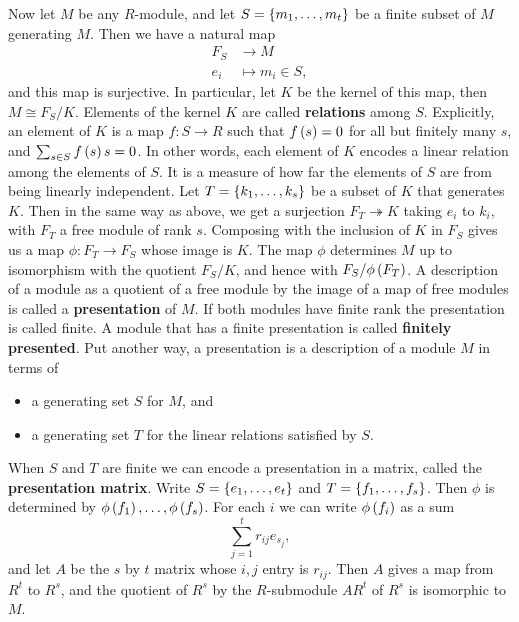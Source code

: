 Now let $ M $ be any $ R $-module, and let $ S = \left\{ m_1, \dots, m_t \right\} $ be a finite subset of $ M $ generating $ M $. Then we have a natural map
\begin{align*}
F_S & \to M \\
e_i & \mapsto m_i \in S,
\end{align*}
and this map is surjective. In particular, let $ K $ be the kernel of this map, then $ M \cong F_S / K $. Elements of the kernel $ K $ are called \textbf{relations} among $ S $. Explicitly, an element of $ K $ is a map $ f : S \to R $ such that $ f\left( s \right) = 0 $ for all but finitely many $ s $, and $ \sum_{s \in S} f\left( s \right)s = 0 $. In other words, each element of $ K $ encodes a linear relation among the elements of $ S $. It is a measure of how far the elements of $ S $ are from being linearly independent. Let $ T = \left\{ k_1, \dots, k_s \right\} $ be a subset of $ K $ that generates $ K $. Then in the same way as above, we get a surjection $ F_T \twoheadrightarrow K $ taking $ e_i $ to $ k_i $, with $ F_T $ a free module of rank $ s $. Composing with the inclusion of $ K $ in $ F_S $ gives us a map $ \phi : F_T \to F_S $ whose image is $ K $. The map $ \phi $ determines $ M $ up to isomorphism with the quotient $ F_S / K $, and hence with $ F_S / \phi\left( F_T \right) $. A description of a module as a quotient of a free module by the image of a map of free modules is called a \textbf{presentation} of $ M $. If both modules have finite rank the presentation is called finite. A module that has a finite presentation is called \textbf{finitely presented}. Put another way, a presentation is a description of a module $ M $ in terms of
\begin{itemize}
\item a generating set $ S $ for $ M $, and
\item a generating set $ T $ for the linear relations satisfied by $ S $.
\end{itemize}
When $ S $ and $ T $ are finite we can encode a presentation in a matrix, called the \textbf{presentation matrix}. Write $ S = \left\{ e_1, \dots, e_t \right\} $ and $ T = \left\{ f_1, \dots, f_s \right\} $. Then $ \phi $ is determined by $ \phi\left( f_1 \right), \dots, \phi\left( f_s \right) $. For each $ i $ we can write $ \phi\left( f_i \right) $ as a sum
$$ \sum_{j = 1}^t r_{ij}e_{s_j}, $$
and let $ A $ be the $ s $ by $ t $ matrix whose $ i, j $ entry is $ r_{ij} $. Then $ A $ gives a map from $ R^t $ to $ R^s $, and the quotient of $ R^s $ by the $ R $-submodule $ AR^t $ of $ R^s $ is isomorphic to $ M $.

